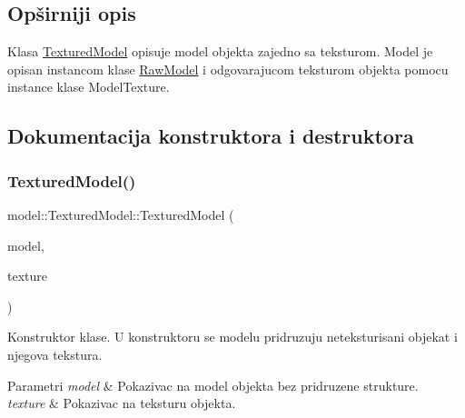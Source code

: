 \subsection{Opširniji opis}
Klasa \hyperlink{classmodel_1_1TexturedModel}{Textured\+Model} opisuje model objekta zajedno sa teksturom. Model je opisan instancom klase \hyperlink{classmodel_1_1RawModel}{Raw\+Model} i odgovarajucom teksturom objekta pomocu instance klase Model\+Texture. 

\subsection{Dokumentacija konstruktora i destruktora}
\mbox{\label{classmodel_1_1TexturedModel_affbb36dc66a365064576e186a975777a}} 
\subsubsection{\texorpdfstring{Textured\+Model()}{TexturedModel()}}
{\footnotesize\ttfamily model\+::\+Textured\+Model\+::\+Textured\+Model (\begin{DoxyParamCaption}\item[{\hyperlink{classmodel_1_1RawModel}{Raw\+Model} $\ast$}]{model,  }\item[{\hyperlink{classtexture_1_1ModelTexture}{Model\+Texture} $\ast$}]{texture }\end{DoxyParamCaption})}



Konstruktor klase. U konstruktoru se modelu pridruzuju neteksturisani objekat i njegova tekstura. 


\begin{DoxyParams}{Parametri}
{\em model} & Pokazivac na model objekta bez pridruzene strukture. \\
\hline
{\em texture} & Pokazivac na teksturu objekta. \\
\hline
\end{DoxyParams}
\mbox{\label{classmodel_1_1TexturedModel_a8a11ba96d5a73a962a2ffcf8c5a53afe}} 
